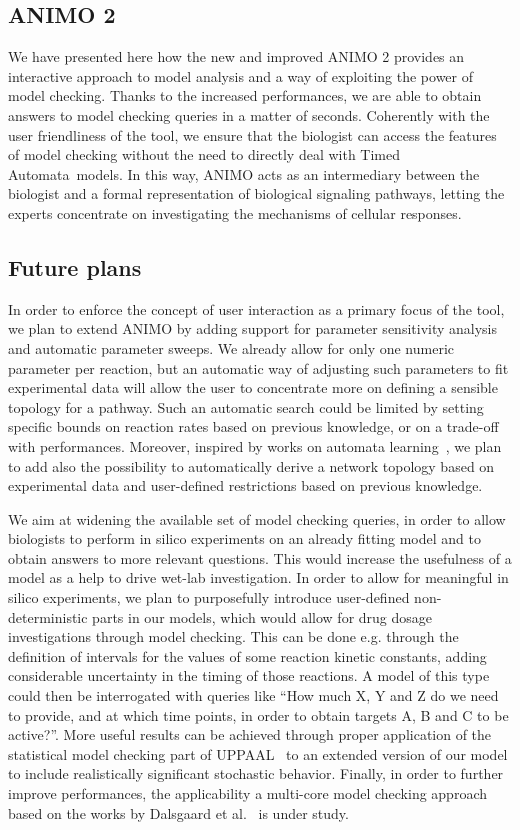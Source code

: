 \documentclass{bmcart}
\def\tas{Timed Automata}
\def\animo2{ANIMO 2}
\begin{document}
\subsection*{\animo2{}}
We have presented here how the new and improved \animo2{} 
provides an interactive approach to model analysis and a way of exploiting the power of model checking.
Thanks to the increased performances,
we are able to obtain answers to model checking queries in a matter of seconds.
Coherently with the user friendliness of the tool, we ensure that the biologist can access the features
of model checking without the need to directly deal with \tas\ models.
In this way, ANIMO acts as an intermediary between the biologist and a formal
representation of biological signaling pathways, letting the experts concentrate
on investigating the mechanisms of cellular responses.


\subsection*{Future plans}
In order to enforce the concept of user interaction as a primary focus of the tool, we plan to extend
ANIMO by adding support for parameter sensitivity analysis and automatic parameter sweeps.
We already allow for only one numeric parameter per reaction, but an automatic way of adjusting such
parameters to fit experimental data will allow the user to concentrate more on defining a sensible topology for a pathway.
Such an automatic search could be limited by setting specific bounds on reaction rates based on previous knowledge,
or on a trade-off with performances.
Moreover, inspired by works on automata learning~\cite{test-based-modelling}, we plan to add also the possibility
to automatically derive a network topology based on experimental data and user-defined restrictions based on
previous knowledge.

We aim at widening the available set of model checking queries, in order to allow biologists to perform
in silico experiments on an already fitting model and to obtain answers to more relevant questions.
This would increase the usefulness of a model as a help to drive wet-lab investigation.
In order to allow for meaningful in silico experiments, we plan to purposefully introduce user-defined non-deterministic 
parts in our models, which would allow for drug dosage investigations through model checking.
This can be done e.g. through the definition of intervals for the values of some reaction kinetic constants,
adding considerable uncertainty in the timing of those reactions.
A model of this type could then be interrogated with queries like ``How much X, Y and Z do we need to provide,
and at which time points, in order to obtain targets A, B and C to be active?''.
More useful results can be achieved through proper application of the statistical model checking part of UPPAAL~\cite{uppaal-smc} to
an extended version of our model to include realistically significant stochastic behavior.
Finally, in order to further improve performances, the applicability a multi-core model checking approach based on the
works by Dalsgaard et al.~\cite{uppaal-multi-core1}
is under study.
\end{document}
